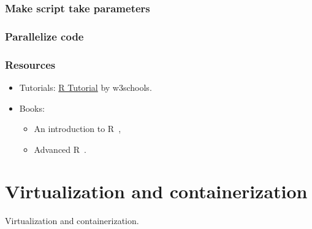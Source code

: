 \documentclass[aspectratio=169]{beamer}
\begin{document}
\begin{frame}
    \frametitle{Make script take parameters}
\end{frame}

\begin{frame}
    \frametitle{Parallelize code}
\end{frame}

\begin{frame}
    \frametitle{Resources}
    \begin{itemize}
        \item Tutorials: \href{https://www.w3schools.com/r/default.asp}
            {R Tutorial} by w3schools.
        \item Books: 
            \begin{itemize}
                \item An introduction to R~\cite{venables2024},
                \item Advanced R~\cite{wickham2015a}.
            \end{itemize}
    \end{itemize}
\end{frame}






\section{Virtualization and containerization}



\begin{frame}
    Virtualization and containerization.
\end{frame}
\end{document}
